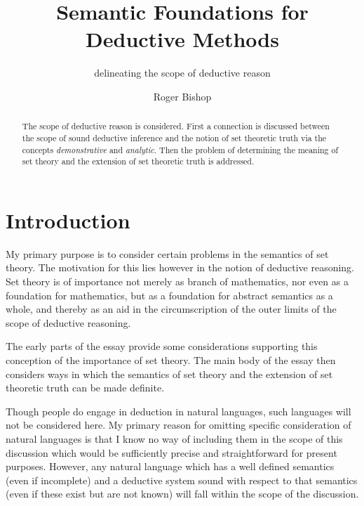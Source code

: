 \documentclass[numreferences]{rbjk}
\begin{document}
                                                                                   
\begin{article}
\begin{opening}  
\title{Semantic Foundations for Deductive Methods}
\subtitle{delineating the scope of deductive reason}
\author{Roger Bishop }

\begin{abstract}

The scope of deductive reason is considered.
First a connection is discussed between the scope of sound deductive inference and the notion of set theoretic truth via the concepts {\it demonstrative} and {\it analytic}.
Then the problem of determining the meaning of set theory and the extension of set theoretic truth is addressed.
\end{abstract}
\end{opening}

\section{Introduction}

My primary purpose is to consider certain problems in the semantics of set theory.
The motivation for this lies however in the notion of deductive reasoning.
Set theory is of importance not merely as branch of mathematics, nor even as a foundation for mathematics, but as a foundation for abstract semantics as a whole, and thereby as an aid in the circumscription of the outer limits of the scope of deductive reasoning.

The early parts of the essay provide some considerations supporting this conception of the importance of set theory.
The main body of the essay then considers ways in which the semantics of set theory and the extension of set theoretic truth can be made definite.

Though people do engage in deduction in natural languages, such languages will not be considered here.
My primary reason for omitting specific consideration of natural languages is that I know no way of including them in the scope of this discussion which would be sufficiently precise and straightforward for present purposes.
However, any natural language which has a well defined semantics (even if incomplete) and a deductive system sound with respect to that semantics (even if these exist but are not known) will fall within the scope of the discussion.


\end{article}
\end{document}
